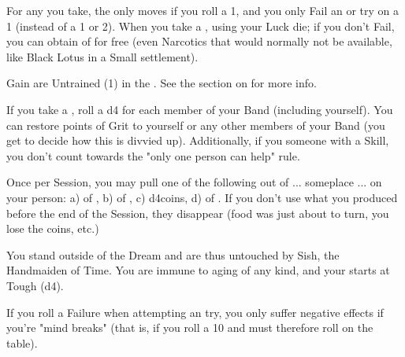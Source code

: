 \begin{multicols*}{2}

    For any  you take, the \UD only moves \DCDOWN if you roll a 1, and you only Fail an  or  try on a 1 (instead of a 1 or 2).  When you take a , \RS using your Luck die; if you don't Fail, you can obtain  of   for free (even Narcotics that would normally not be available, like Black Lotus in a Small settlement).
    


Gain are Untrained (1) in the . See the section on  for more info.



    If you take a , roll a d4 for each member of your Band (including yourself). You can restore \SUM points of Grit to yourself or any other members of your Band (you get to decide how this is divvied up).  Additionally, if you  someone with a Skill, you don't count towards the "only one person can help" rule.

\newpage


Once per Session, you may pull one of the following out of ... someplace ... on your person:  a)  of , b)  of , c) d4\AG coins, d)  of . If you don't use what you produced before the end of the Session, they disappear (food was just about to turn, you lose the coins, etc.)


  You stand outside of the Dream and are thus untouched by Sish, the Handmaiden of Time. You are immune to aging of any kind, and your \DEATH starts at Tough (d4).



   If you roll a Failure when attempting an  try, you only suffer negative effects if you're "mind breaks" (that is, if you roll a 10 and must therefore roll on the  table).




\end{multicols*}
